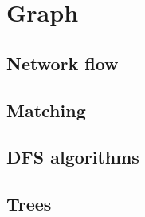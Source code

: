\chapter{Graph}


\section{Network flow}

\section{Matching}

\section{DFS algorithms}



\section{Trees}


